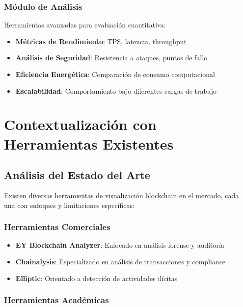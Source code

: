\documentclass[spanish,12pt,letterpaper]{report}
\begin{document}
\subsubsection{Módulo de Análisis}

Herramientas avanzadas para evaluación cuantitativa:

\begin{itemize}
    \item \textbf{Métricas de Rendimiento}: TPS, latencia, throughput
    \item \textbf{Análisis de Seguridad}: Resistencia a ataques, puntos de fallo
    \item \textbf{Eficiencia Energética}: Comparación de consumo computacional
    \item \textbf{Escalabilidad}: Comportamiento bajo diferentes cargas de trabajo
\end{itemize}

\section{Contextualización con Herramientas Existentes}

\subsection{Análisis del Estado del Arte}

Existen diversas herramientas de visualización blockchain en el mercado, cada una con enfoques y limitaciones específicas:

\subsubsection{Herramientas Comerciales}

\begin{itemize}
    \item \textbf{EY Blockchain Analyzer}: Enfocado en análisis forense y auditoría \cite{ey_blockchain_analyzer}
    \item \textbf{Chainalysis}: Especializado en análisis de transacciones y compliance
    \item \textbf{Elliptic}: Orientado a detección de actividades ilícitas
\end{itemize}

\subsubsection{Herramientas Académicas}
\end{document}
